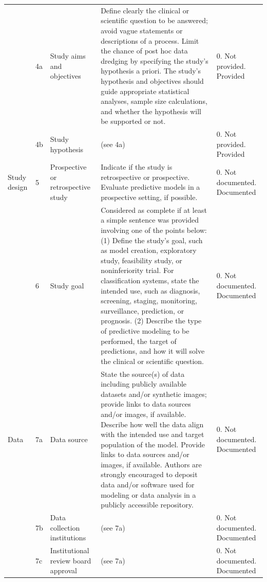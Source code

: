 \begin{landscape}
\begin{longtable}{@{}p{1.7cm}p{0.7cm}p{3.6cm}p{9.6cm}p{3.2cm}@{}}
	\addlinespace
	& 4a & Study aims and objectives & Define clearly the clinical or scientific question to be answered; avoid vague statements or descriptions of a process. Limit the chance of post hoc data dredging by specifying the study's hypothesis a priori. The study's hypothesis and objectives should guide appropriate statistical analyses, sample size calculations, and whether the hypothesis will be supported or not. & 0. Not provided\newline 1. Provided \\
	& 4b & Study hypothesis & (see 4a) & 0. Not provided\newline 1. Provided \\
	\addlinespace
	Study design & 5 & Prospective or retrospective study & Indicate if the study is retrospective or prospective. Evaluate predictive models in a prospective setting, if possible. & 0. Not documented\newline 1. Documented \\
	\addlinespace
	& 6 & Study goal & Considered as complete if at least a simple sentence was provided involving one of the points below: (1) Define the study's goal, such as model creation, exploratory study, feasibility study, or noninferiority trial. For classification systems, state the intended use, such as diagnosis, screening, staging, monitoring, surveillance, prediction, or prognosis. (2) Describe the type of predictive modeling to be performed, the target of predictions, and how it will solve the clinical or scientific question. & 0. Not documented\newline 1. Documented \\
	\addlinespace
	Data & 7a & Data source & State the source(s) of data including publicly available datasets and/or synthetic images; provide links to data sources and/or images, if available. Describe how well the data align with the intended use and target population of the model. Provide links to data sources and/or images, if available. Authors are strongly encouraged to deposit data and/or software used for modeling or data analysis in a publicly accessible repository. & 0. Not documented\newline 1. Documented \\
	& 7b & Data collection institutions & (see 7a) & 0. Not documented\newline 1. Documented \\
	& 7c & Institutional review board approval & (see 7a) & 0. Not documented\newline 1. Documented \\

\end{longtable}
\end{landscape}
